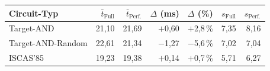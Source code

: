 \begin{tabular}{lrrrrrr}
\toprule
Circuit-Typ & $\bar{t}_{\text{Full}}$ & $\bar{t}_{\text{Perf.}}$ & $\Delta$ (ms) & $\Delta$ (\%) & $s_{\text{Full}}$ & $s_{\text{Perf.}}$ \\
\midrule
Target-AND & 21,10 & 21,69 & $+$0,60 & $+$2,8\,\% & 7,35 & 8,16 \\
Target-AND-Random & 22,61 & 21,34 & $-$1,27 & $-$5,6\,\% & 7,02 & 7,04 \\
ISCAS'85 & 19,23 & 19,38 & $+$0,14 & $+$0,7\,\% & 5,71 & 6,27 \\
\bottomrule
\end{tabular}
